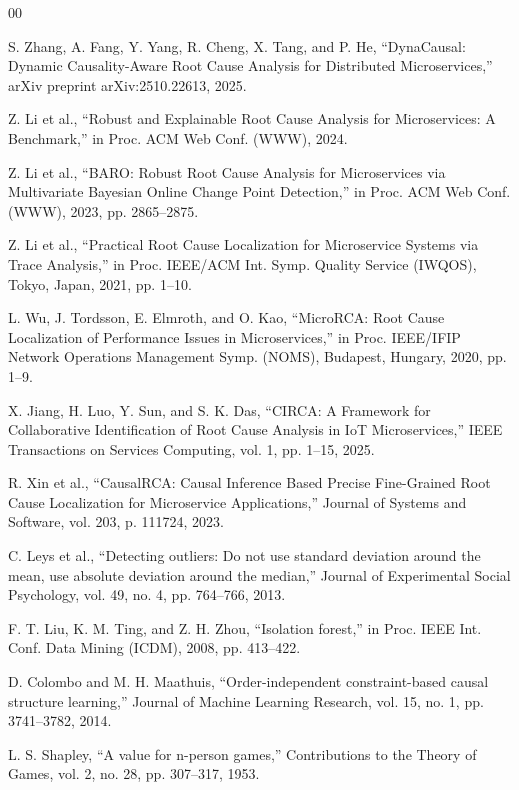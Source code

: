 \documentclass[conference]{IEEEtran}
\begin{document}
\begin{thebibliography}{00}

S. Zhang, A. Fang, Y. Yang, R. Cheng, X. Tang, and P. He, ``DynaCausal: Dynamic Causality-Aware Root Cause Analysis for Distributed Microservices,'' arXiv preprint arXiv:2510.22613, 2025.

Z. Li et al., ``Robust and Explainable Root Cause Analysis for Microservices: A Benchmark,'' in Proc. ACM Web Conf. (WWW), 2024.

Z. Li et al., ``BARO: Robust Root Cause Analysis for Microservices via Multivariate Bayesian Online Change Point Detection,'' in Proc. ACM Web Conf. (WWW), 2023, pp. 2865--2875.

Z. Li et al., ``Practical Root Cause Localization for Microservice Systems via Trace Analysis,'' in Proc. IEEE/ACM Int. Symp. Quality Service (IWQOS), Tokyo, Japan, 2021, pp. 1--10.

L. Wu, J. Tordsson, E. Elmroth, and O. Kao, ``MicroRCA: Root Cause Localization of Performance Issues in Microservices,'' in Proc. IEEE/IFIP Network Operations Management Symp. (NOMS), Budapest, Hungary, 2020, pp. 1--9.

X. Jiang, H. Luo, Y. Sun, and S. K. Das, ``CIRCA: A Framework for Collaborative Identification of Root Cause Analysis in IoT Microservices,'' IEEE Transactions on Services Computing, vol. 1, pp. 1--15, 2025.

R. Xin et al., ``CausalRCA: Causal Inference Based Precise Fine-Grained Root Cause Localization for Microservice Applications,'' Journal of Systems and Software, vol. 203, p. 111724, 2023.

C. Leys et al., ``Detecting outliers: Do not use standard deviation around the mean, use absolute deviation around the median,'' Journal of Experimental Social Psychology, vol. 49, no. 4, pp. 764--766, 2013.

F. T. Liu, K. M. Ting, and Z. H. Zhou, ``Isolation forest,'' in Proc. IEEE Int. Conf. Data Mining (ICDM), 2008, pp. 413--422.

D. Colombo and M. H. Maathuis, ``Order-independent constraint-based causal structure learning,'' Journal of Machine Learning Research, vol. 15, no. 1, pp. 3741--3782, 2014.

L. S. Shapley, ``A value for n-person games,'' Contributions to the Theory of Games, vol. 2, no. 28, pp. 307--317, 1953.


\end{thebibliography}
\end{document}
